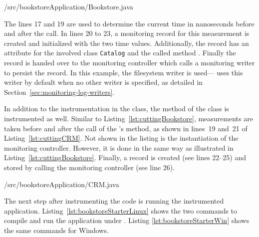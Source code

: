 
\setJavaCodeListing
%
{\manualInstrumentedBookstoreApplicationDir/src/bookstoreApplication/Bookstore.java}
 
\noindent The lines 17 and 19 are used to determine the current time in nanoseconds before and after the  call. In lines 20 to 23, a monitoring record for this measurement is created and initialized with the two time values. Additionally, the record has an attribute for the involved class \verb!Catalog! and the called method . Finally the record is handed over to the monitoring controller which calls a monitoring writer to persist the record. %
In this example, the filesystem writer is used---\Kieker{} uses this writer by default when no other writer is specified, %
as detailed in Section~\ref{sec:monitoring-log-writers}. %

In addition to the instrumentation in the  class, the  method of the  class is instrumented as well. Similar to Listing~\ref{lst:cuttingBookstore}, measurements are taken before and after the call of the 's  method, as shown in %
lines~19 and~21 of Listing~\ref{lst:cuttingCRM}. Not shown in the listing is the instantiation of the monitoring controller. However, it is done in the same way as illustrated in Listing~\ref{lst:cuttingBookstore}. %
Finally, a record is created (see lines 22--25) and stored by calling the monitoring controller (see line 26).

\setJavaCodeListing
%
{\manualInstrumentedBookstoreApplicationDir/src/bookstoreApplication/CRM.java}

\enlargethispage{0.5cm}

\noindent %
The next step after instrumenting the code is running the instrumented application. Listing~\ref{lst:bookstoreStarterLinux} shows the two commands to compile and run the application under \UnixLikeSystems{}. Listing \ref{lst:bookstoreStarterWin} shows the same commands for Windows.

